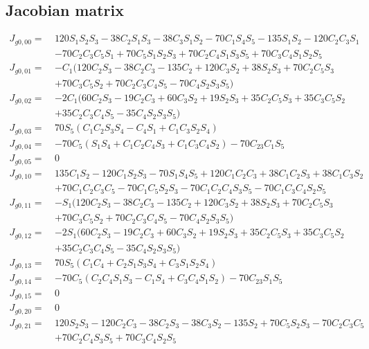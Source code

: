 \documentclass[12pt]{article}
\begin{document}
\begin{CJK}{UTF8}{bsmi}
\subsection{Jacobian matrix}\label{appendix:jacobian}
\begin{equation*}
\begin{split}
J_{g0,00} =\  &120S_1S_2S_3 - 38C_2S_1S_3 - 38C_3S_1S_2 - 70C_1S_4S_5 - 135S_1S_2 - 120C_2C_3S_1\\
         	  &- 70C_2C_3C_5S_1 + 70C_5S_1S_2S_3  + 70C_2C_4S_1S_3S_5 + 70C_3C_4S_1S_2S_5\\
J_{g0,01} =\  &-C_1(120C_2S_3 - 38C_2C_3 - 135C_2 + 120C_3S_2 + 38S_2S_3 + 70C_2C_5S_3 \\
         	  &+ 70C_3C_5S_2 + 70C_2C_3C_4S_5 - 70C_4S_2S_3S_5)\\
J_{g0,02} =\  &-2C_1(60C_2S_3 - 19C_2C_3 + 60C_3S_2 + 19S_2S_3 + 35C_2C_5S_3 + 35C_3C_5S_2\\ 
         	  &+ 35C_2C_3C_4S_5 - 35C_4S_2S_3S_5)\\
J_{g0,03} =\  &70S_5(C_1C_2S_3S_4 - C_4S_1 + C_1C_3S_2S_4)\\
J_{g0,04} =\  &- 70C_5(S_1S_4 + C_1C_2C_4S_3 + C_1C_3C_4S_2) - 70C_{23}C_1S_5\\
J_{g0,05} =\  &0\\
J_{g0,10} =\  &135C_1S_2 - 120C_1S_2S_3 - 70S_1S_4S_5 + 120C_1C_2C_3 + 38C_1C_2S_3 + 38C_1C_3S_2 \\
		 	  &+ 70C_1C_2C_3C_5 - 70C_1C_5S_2S_3 - 70C_1C_2C_4S_3S_5 - 70C_1C_3C_4S_2S_5\\
J_{g0,11} =\  &-S_1(120C_2S_3 - 38C_2C_3 - 135C_2 + 120C_3S_2 + 38S_2S_3 + 70C_2C_5S_3\\
		   	  &+ 70C_3C_5S_2 + 70C_2C_3C_4S_5 - 70C_4S_2S_3S_5)\\
J_{g0,12} =\  &-2S_1(60C_2S_3 - 19C_2C_3 + 60C_3S_2 + 19S_2S_3 + 35C_2C_5S_3 + 35C_3C_5S_2 \\ 
		 	  &+ 35C_2C_3C_4S_5 - 35C_4S_2S_3S_5)\\
J_{g0,13} =\  &70S_5(C_1C_4 + C_2S_1S_3S_4 + C_3S_1S_2S_4)\\
J_{g0,14} =\  &- 70C_5(C_2C_4S_1S_3 - C_1S_4 + C_3C_4S_1S_2) - 70C_{23}S_1S_5\\
J_{g0,15} =\  &0\\
J_{g0,20} =\  &0\\
J_{g0,21} =\  &120S_2S_3 - 120C_2C_3 - 38C_2S_3 - 38C_3S_2 - 135S_2 + 70C_5S_2S_3 - 70C_2C_3C_5\\
		 	  &+ 70C_2C_4S_3S_5 + 70C_3C_4S_2S_5\\

\end{split}
\end{equation*}
\end{CJK}
\end{document}
